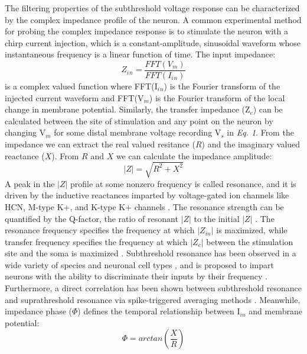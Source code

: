 \documentclass[utf8]{frontiersSCNS} %
\begin{document}
The filtering properties of the subthreshold voltage response can be characterized by the complex impedance profile of the neuron.
A common experimental method for probing the complex impedance response is to stimulate the neuron with a chirp current injection, which
is a constant-amplitude, sinusoidal waveform whose instantaneous frequency is a linear function of time.  The input impedance:
\begin{equation}  Z_i{_n} = \frac{FFT(V_m)}{FFT(I_i{_n})} \label{eq:01}\end{equation}
is a complex valued function where FFT(I$_i{_n}$) is the Fourier transform of the injected current waveform and FFT(V$_m$) is the Fourier
transform of the local change in membrane potential.  Similarly, the transfer impedance (Z$_c$) can be calculated between the site of stimulation
and any point on the neuron by changing V$_m$ for some distal membrane voltage recording V$_s$ in \emph{Eq. 1}. From the impedance we can
extract the real valued resitance ($R$) and the imaginary valued reactance ($X$).  From $R$ and $X$ we can calculate the impedance amplitude:
\begin{equation} |Z| = \sqrt{R^2 + X^2} \label{eq:02}\end{equation}
A peak in the $|Z|$ profile at some nonzero frequency is called resonance, and it is driven by
the inductive reactances imparted by voltage-gated ion channels like HCN, M-type K+, and 
K-type K+ channels \citep{Das2017-nz}.  The resonance strength can be quantified by the 
Q-factor, the ratio of resonant $|Z|$ to the initial $|Z|$ \citep{Dewell2019-ra}. The 
resonance frequency specifies the frequency at which $|Z_{in}|$ is maximized, while
transfer frequency specifies the frequency at which $|Z_c|$ between the stimulation site and 
the soma is maximized \citep{Dembrow2015-zb}.  Subthreshold resonance has been observed in a wide 
variety of species and neuronal cell types \citep{Crawford1981-av, Puil1988-ca, Hutcheon2000-gs, Yoshida2011-ec, Ulrich2002-dd},
and is proposed to impart neurons with the ability to discriminate their inputs by their 
frequency \citep{Branco2010-nr, Das2017-nz}. Furthermore, a direct correlation has been shown between subthreshold resonance and suprathreshold
resonance via spike-triggered averaging methods \citep{Das2015-mh}.
Meanwhile, impedance phase ($\Phi$) defines the temporal relationship between I$_{in}$ and membrane potential:
\begin{equation} \Phi = arctan(\frac{X}{R}) \label{eq:03}\end{equation}
\end{document}
